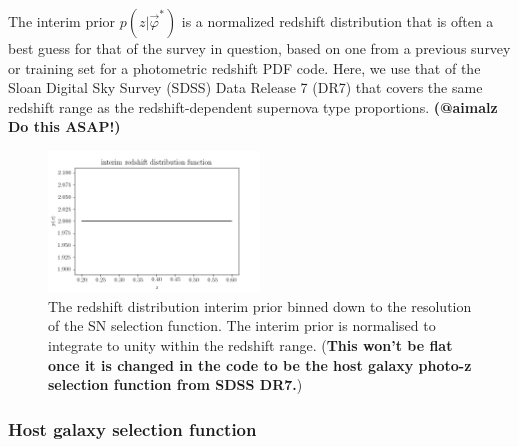 \documentclass[12pt, twocolumn]{emulateapj}
\begin{document}
The interim prior $p(z | \vec{\varphi}^{*})$ is a normalized redshift distribution that is often a best guess for that of the survey in question, based on one from a previous survey or training set for a photometric redshift PDF code.  
Here, we use that of the Sloan Digital Sky Survey (SDSS) Data Release 7 (DR7) that covers the same redshift range as the redshift-dependent supernova type proportions.  \textbf{(@aimalz Do this ASAP!)}

\begin{figure}
	\begin{center}
		\includegraphics[width=0.5\textwidth]{fig/pz_interim_prior.png}
		\caption{The redshift distribution interim prior binned down to the resolution of the SN selection function. 
		The interim prior is normalised to integrate to unity within the redshift range. 
		(\textbf{This won't be flat once it is changed in the code to be the host galaxy photo-z selection function from SDSS DR7.})}
		\label{fig:hostintpr}
	\end{center}
\end{figure}

\subsubsection{Host galaxy selection function}
\label{sec:hostselection}
\end{document}
